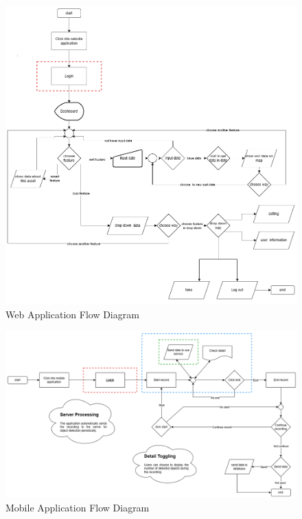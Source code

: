 \begin{figure}[ht]
  \begin{center}
  \includegraphics[scale=0.7]{resources/WebsiteFlow.png}
  \end{center}
  \caption[Web Application Flow Diagram]{Web Application Flow Diagram}
  \label{fig:web-app flow design}
\end{figure}

\begin{figure}[ht]
  \begin{center}
  \includegraphics[scale=0.5]{resources/MobileAppFlow.png}
  \end{center}
  \caption[Mobile Application Flow Diagram]{Mobile Application Flow Diagram}
  \label{fig:mopile-app flow design}
\end{figure}

